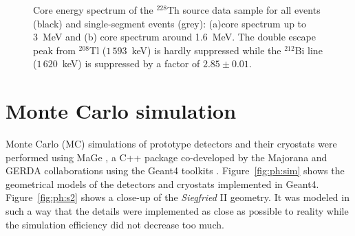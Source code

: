 \begin{figure}[htbp]
\centering
{}%
%
\caption{Core energy spectrum of the $^{228}$Th source data sample for all events (black) and single-segment events (grey): (a)core spectrum up to 3~MeV and (b) core spectrum around 1.6~MeV. The double escape peak from $^{208}$Tl ($1\,593$~keV) is hardly suppressed while the $^{212}$Bi line ($1\,620$~keV) is suppressed by a factor of $2.85 \pm 0.01$.}
\label{fig:ph:seg}
\end{figure}

\section{Monte Carlo simulation}
\label{sec:ph:sim}
Monte Carlo (MC) simulations of prototype detectors and their cryostats were performed using MaGe \cite{Mag06, Mag08}, a C++ package co-developed by the Majorana and GERDA collaborations using the Geant4 toolkits \cite{Gea03, Gea06}. Figure~\ref{fig:ph:sim} shows the geometrical models of the detectors and cryostats implemented in Geant4. Figure~\ref{fig:ph:s2} shows a close-up of the \emph{Siegfried} II geometry. It was modeled in such a way that the details were implemented as close as possible to reality while the simulation efficiency did not decrease too much.
 
